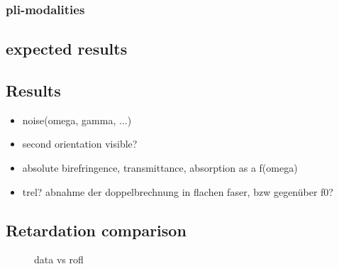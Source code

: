 \subsubsection{pli-modalities}
% 

% 
% 
\subsection{expected results}
% 
% 
% 
\subsection{Results}
% 
\begin{itemize}
\item noise(omega, gamma, ...)
\item second orientation visible?
\item absolute birefringence, transmittance, absorption as a f(omega)
\item trel? abnahme der doppelbrechnung in flachen faser, bzw gegenüber f0?
\end{itemize}
% 
% 
% 
\subsection{Retardation comparison}
% 
\begin{figure}[!t]
\centering
{}
\caption[data vs rofl]{data vs rofl}
\label{fig:dataVsRofl}
\end{figure}
% 
% 
% 
% 
